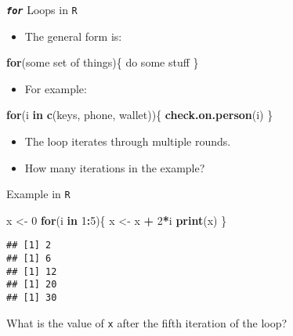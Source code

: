 \documentclass[ignorenonframetext,]{beamer}
\newenvironment{Shaded}{\begin{snugshade}}{\end{snugshade}}
\newcommand{\KeywordTok}[1]{\textcolor[rgb]{0.13,0.29,0.53}{\textbf{#1}}}
\newcommand{\DecValTok}[1]{\textcolor[rgb]{0.00,0.00,0.81}{#1}}
\newcommand{\StringTok}[1]{\textcolor[rgb]{0.31,0.60,0.02}{#1}}
\newcommand{\ControlFlowTok}[1]{\textcolor[rgb]{0.13,0.29,0.53}{\textbf{#1}}}
\newcommand{\OperatorTok}[1]{\textcolor[rgb]{0.81,0.36,0.00}{\textbf{#1}}}
\newcommand{\NormalTok}[1]{#1}
\providecommand{\tightlist}{%
	\setlength{\itemsep}{0pt}\setlength{\parskip}{0pt}}
\begin{document}
\begin{frame}[fragile]{\textbf{\emph{\texttt{for}}} Loops in \texttt{R}}

\begin{itemize}
\tightlist
\item
  The general form is:
\end{itemize}

\begin{Shaded}
\begin{Highlighting}[]
\ControlFlowTok{for}\NormalTok{(some set of things)\{}
\NormalTok{  do some stuff}
\NormalTok{\} }
\end{Highlighting}
\end{Shaded}

\begin{itemize}
\tightlist
\item
  For example:
\end{itemize}

\begin{Shaded}
\begin{Highlighting}[]
\ControlFlowTok{for}\NormalTok{(i }\ControlFlowTok{in} \KeywordTok{c}\NormalTok{(keys, phone, wallet))\{}
  \KeywordTok{check.on.person}\NormalTok{(i)}
\NormalTok{\} }
\end{Highlighting}
\end{Shaded}

\begin{itemize}
\tightlist
\item
  The loop \alert{iterates} through multiple rounds.
\item
  How many iterations in the example?
\end{itemize}

\end{frame}

\begin{frame}[fragile]{Example in \texttt{R}}

\begin{Shaded}
\begin{Highlighting}[]
\NormalTok{x <-}\StringTok{ }\DecValTok{0}
\ControlFlowTok{for}\NormalTok{(i }\ControlFlowTok{in} \DecValTok{1}\OperatorTok{:}\DecValTok{5}\NormalTok{)\{}
\NormalTok{  x <-}\StringTok{ }\NormalTok{x }\OperatorTok{+}\StringTok{ }\DecValTok{2}\OperatorTok{*}\NormalTok{i}
  \KeywordTok{print}\NormalTok{(x)}
\NormalTok{\}}
\end{Highlighting}
\end{Shaded}

\begin{verbatim}
## [1] 2
## [1] 6
## [1] 12
## [1] 20
## [1] 30
\end{verbatim}

What is the value of \texttt{x} after the fifth iteration of the loop?

\end{frame}
\end{document}
